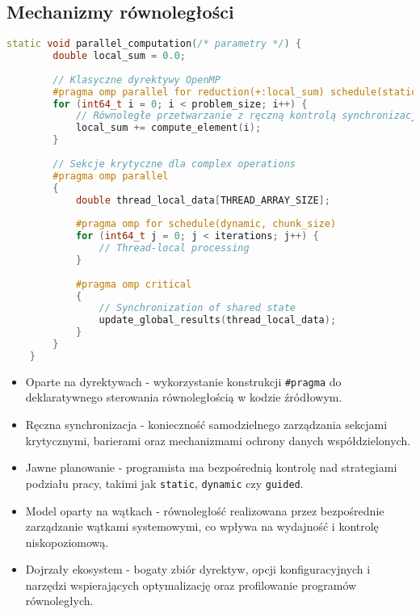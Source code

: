 \subsection{Mechanizmy równoległości}
\begin{lstlisting}[language=C++, caption={Mechanizmy równoległości w benchmarkach C++ z OpenMP}, label={lst:openmp_parallelism}]
    static void parallel_computation(/* parametry */) {
        double local_sum = 0.0;
        
        // Klasyczne dyrektywy OpenMP
        #pragma omp parallel for reduction(+:local_sum) schedule(static)
        for (int64_t i = 0; i < problem_size; i++) {
            // Równoległe przetwarzanie z ręczną kontrolą synchronizacji
            local_sum += compute_element(i);
        }
        
        // Sekcje krytyczne dla complex operations
        #pragma omp parallel
        {
            double thread_local_data[THREAD_ARRAY_SIZE];
            
            #pragma omp for schedule(dynamic, chunk_size)
            for (int64_t j = 0; j < iterations; j++) {
                // Thread-local processing
            }
            
            #pragma omp critical
            {
                // Synchronization of shared state
                update_global_results(thread_local_data);
            }
        }
    }
\end{lstlisting}
\begin{itemize}
    \item Oparte na dyrektywach - wykorzystanie konstrukcji \texttt{\#pragma} do deklaratywnego sterowania równoległością w kodzie źródłowym.
    
    \item Ręczna synchronizacja - konieczność samodzielnego zarządzania sekcjami krytycznymi, barierami oraz mechanizmami ochrony danych współdzielonych.
    
    \item Jawne planowanie - programista ma bezpośrednią kontrolę nad strategiami podziału pracy, takimi jak \texttt{static}, \texttt{dynamic} czy \texttt{guided}.
    
    \item Model oparty na wątkach - równoległość realizowana przez bezpośrednie zarządzanie wątkami systemowymi, co wpływa na wydajność i kontrolę niskopoziomową.
    
    \item Dojrzały ekosystem - bogaty zbiór dyrektyw, opcji konfiguracyjnych i narzędzi wspierających optymalizację oraz profilowanie programów równoległych.
\end{itemize}
  
